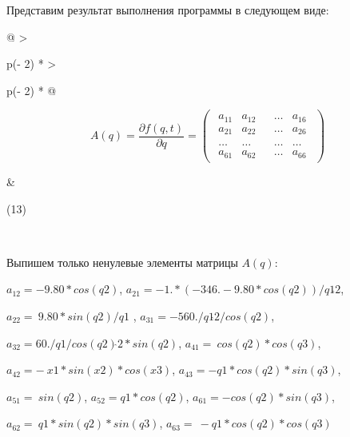 Представим результат выполнения программы в следующем виде:

\begin{longtable}{@{}
  >{\raggedright\arraybackslash}p{(\columnwidth - 2\tabcolsep) * }
  >{\raggedright\arraybackslash}p{(\columnwidth - 2\tabcolsep) * }@{}}
\begin{minipage}[b]{\linewidth}\raggedright
\[A(q) = \frac{\partial f(q,t)}{\partial q} = \begin{pmatrix}
\begin{matrix}
a_{11} & a_{12} \\
a_{21} & a_{22}
\end{matrix} & \begin{matrix}
\ldots & a_{16} \\
\ldots & a_{26}
\end{matrix} \\
\begin{matrix}
\ldots & \ldots \\
a_{61} & a_{62}
\end{matrix} & \begin{matrix}
\ldots & \ldots \\
\ldots & a_{66}
\end{matrix}
\end{pmatrix}\]
\end{minipage} & \begin{minipage}[b]{\linewidth}\raggedright
(13)
\end{minipage} \\

\end{longtable}


Выпишем только ненулевые элементы матрицы \(A(q)\):

\(a_{12} = - 9.80*cos(q2)\),
\(a_{21} = - 1.*( - 346. - 9.80*cos(q2))/q1\hat{}2\),

\(a_{22} = \ 9.80*sin(q2)/q1\) , \(a_{31} = - 560./q1\hat{}2/cos(q2)\),

\(a_{32} = 60./q1/cos(q2)\hat{}2*sin(q2)\),
\(a_{41} = \ cos(q2)*cos(q3)\),

\(a_{42} = - \ x1*sin(x2)*cos(x3)\), \(a_{43} = - q1*cos(q2)*sin(q3)\),

\(a_{51} = \ sin(q2)\), \(a_{52} = q1*cos(q2)\),
\(a_{61} = - cos(q2)*sin(q3)\),

\(a_{62} = \ q1*sin(q2)*sin(q3)\), \(a_{63} = \  - q1*cos(q2)*cos(q3)\)

